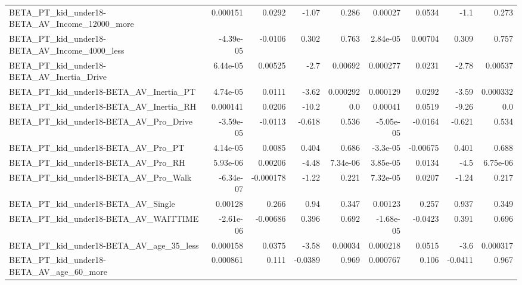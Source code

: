 \begin{tabular}{lrrrrrrrr}
BETA\_PT\_kid\_under18-BETA\_AV\_Income\_12000\_more      &    0.000151 &       0.0292 &    -1.07 &    0.286 &    0.00027 &      0.0534 &         -1.1 &         0.273 \\
BETA\_PT\_kid\_under18-BETA\_AV\_Income\_4000\_less       &   -4.39e-05 &      -0.0106 &    0.302 &    0.763 &   2.84e-05 &     0.00704 &        0.309 &         0.757 \\
BETA\_PT\_kid\_under18-BETA\_AV\_Inertia\_Drive          &    6.44e-05 &      0.00525 &     -2.7 &  0.00692 &   0.000277 &      0.0231 &        -2.78 &       0.00537 \\
BETA\_PT\_kid\_under18-BETA\_AV\_Inertia\_PT             &    4.74e-05 &       0.0111 &    -3.62 & 0.000292 &   0.000129 &      0.0292 &        -3.59 &      0.000332 \\
BETA\_PT\_kid\_under18-BETA\_AV\_Inertia\_RH             &    0.000141 &       0.0206 &    -10.2 &      0.0 &    0.00041 &      0.0519 &        -9.26 &           0.0 \\
BETA\_PT\_kid\_under18-BETA\_AV\_Pro\_Drive              &   -3.59e-05 &      -0.0113 &   -0.618 &    0.536 &  -5.05e-05 &     -0.0164 &       -0.621 &         0.534 \\
BETA\_PT\_kid\_under18-BETA\_AV\_Pro\_PT                 &    4.14e-05 &       0.0085 &    0.404 &    0.686 &   -3.3e-05 &    -0.00675 &        0.401 &         0.688 \\
BETA\_PT\_kid\_under18-BETA\_AV\_Pro\_RH                 &    5.93e-06 &      0.00206 &    -4.48 & 7.34e-06 &   3.85e-05 &      0.0134 &         -4.5 &      6.75e-06 \\
BETA\_PT\_kid\_under18-BETA\_AV\_Pro\_Walk               &   -6.34e-07 &    -0.000178 &    -1.22 &    0.221 &   7.32e-05 &      0.0207 &        -1.24 &         0.217 \\
BETA\_PT\_kid\_under18-BETA\_AV\_Single                 &     0.00128 &        0.266 &     0.94 &    0.347 &    0.00123 &       0.257 &        0.937 &         0.349 \\
BETA\_PT\_kid\_under18-BETA\_AV\_WAITTIME               &   -2.61e-06 &     -0.00686 &    0.396 &    0.692 &  -1.68e-05 &     -0.0423 &        0.391 &         0.696 \\
BETA\_PT\_kid\_under18-BETA\_AV\_age\_35\_less            &    0.000158 &       0.0375 &    -3.58 &  0.00034 &   0.000218 &      0.0515 &         -3.6 &      0.000317 \\
BETA\_PT\_kid\_under18-BETA\_AV\_age\_60\_more            &    0.000861 &        0.111 &  -0.0389 &    0.969 &   0.000767 &       0.106 &      -0.0411 &         0.967 \\

\end{tabular}
